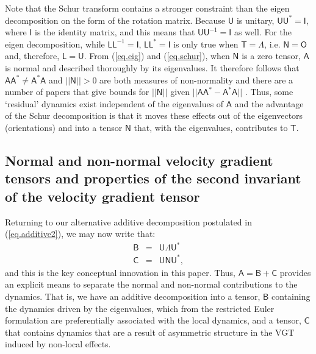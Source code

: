 \documentclass[preprint,amssymb,amsmath,aip,cha]{revtex4-1}
\begin{document}
Note that the Schur transform contains a stronger constraint than the eigen decomposition on the form of the rotation matrix. Because $\mathsf{U}$ is unitary, $\mathsf{U}\mathsf{U}^{*} = \mathsf{I}$, where $\mathsf{I}$ is the identity matrix, and this means that $\mathsf{U}\mathsf{U}^{-1} = \mathsf{I}$ as well. For the eigen decomposition, while $\mathsf{L}\mathsf{L}^{-1} = \mathsf{I}$, $\mathsf{L}\mathsf{L}^{*} = \mathsf{I}$ is only true when $\mathsf{T} = \mathsf{\Lambda}$, i.e. $\mathsf{N} = \mathsf{O}$ and, therefore, $\mathsf{L} = \mathsf{U}$. From (\ref{eq.eig}) and (\ref{eq.schur}), when $\mathsf{N}$ is a zero tensor, $\mathsf{A}$ is normal and described thoroughly by its eigenvalues. It therefore follows that $\mathsf{A}\mathsf{A}^{*} \ne \mathsf{A}^{*}\mathsf{A}$ and $||\mathsf{N}|| > 0$ are both measures of non-normality and there are a number of papers that give bounds for $||\mathsf{N}||$ given $||\mathsf{A}\mathsf{A}^{*} - \mathsf{A}^{*}\mathsf{A}||$ \citep{henrici62, eberlein65, lee95}. Thus, some `residual' dynamics exist independent of the eigenvalues of $\mathsf{A}$ and the advantage of the Schur decomposition is that it moves these effects out of the eigenvectors (orientations) and into a tensor $\mathsf{N}$ that, with the eigenvalues, contributes to $\mathsf{T}$.
 
\subsection{Normal and non-normal velocity gradient tensors and properties of the second invariant of the velocity gradient tensor}
Returning to our alternative additive decomposition postulated in (\ref{eq.additive2}), we may now write that:
\begin{eqnarray}
\label{eq.B}
\mathsf{B} &=& \mathsf{U}\mathsf{\Lambda}\mathsf{U}^{*} \\
\mathsf{C} &=& \mathsf{U}\mathsf{N}\mathsf{U}^{*},
\label{eq.C}
\end{eqnarray}
and this is the key conceptual innovation in this paper. Thus, $\mathsf{A} = \mathsf{B} + \mathsf{C}$ provides an explicit means to separate the normal and non-normal contributions to the dynamics. That is, we have an additive decomposition into a tensor, $\mathsf{B}$ containing the dynamics driven by the eigenvalues, which from the restricted Euler formulation are preferentially associated with the local dynamics, and a tensor, $\mathsf{C}$ that contains dynamics that are a result of asymmetric structure in the VGT induced by non-local effects.
\end{document}
